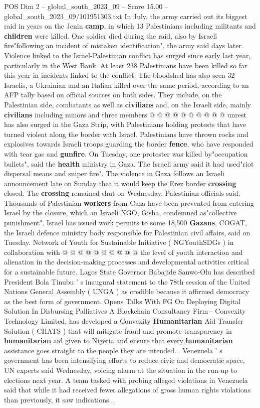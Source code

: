 \begin{textsample}{POS Dim 2 – global\_south\_2023\_09 – Score 15.00 – global\_south\_2023\_09/101951303.txt}
In July, the army carried out its biggest raid in years on the Jenin \textbf{camp}, in which 13 Palestinians including militants and \textbf{children} were killed.
One soldier died during the raid, also by Israeli fire"following an incident of mistaken identification", the army said days later.
Violence linked to the Israel-Palestinian conflict has surged since early last year, particularly in the West Bank.
At least 238 Palestinians have been killed so far this year in incidents linked to the conflict.
The bloodshed has also seen 32 Israelis, a Ukrainian and an Italian killed over the same period, according to an AFP tally based on official sources on both sides.
They include, on the Palestinian side, combatants as well as \textbf{civilians} and, on the Israeli side, mainly \textbf{civilians} including minors and three members @ @ @ @ @ @ @ @ @ @ unrest has also surged in the Gaza Strip, with Palestinians holding protests that have turned violent along the border with Israel.
Palestinians have thrown rocks and explosives towards Israeli troops guarding the border \textbf{fence}, who have responded with tear gas and \textbf{gunfire}.
On Tuesday, one protester was killed by"occupation bullets", said the \textbf{health} ministry in Gaza.
The Israeli army said it had used"riot dispersal means and sniper fire".
The violence in Gaza follows an Israeli announcement late on Sunday that it would keep the Erez border \textbf{crossing} closed.
The \textbf{crossing} remained shut on Wednesday, Palestinian officials said.
Thousands of Palestinian \textbf{workers} from Gaza have been prevented from entering Israel by the closure, which an Israeli NGO, Gisha, condemned as"collective punishment".
Israel has issued work permits to some 18,500 \textbf{Gazans}, COGAT, the Israeli defence ministry body responsible for Palestinian civil affairs, said on Tuesday.
Network of Youth for Sustainable Initiative ( NGYouthSDGs ) in collaboration with @ @ @ @ @ @ @ @ @ @ the level of youth interaction and alienation in the decision-making processes and developmental activities critical for a sustainable future.
Lagos State Governor Babajide Sanwo-Olu has described President Bola Tinubu ' s inaugural statement to the 78th session of the United Nations General Assembly ( UNGA ) as credible because it affirmed democracy as the best form of government.
Opens Talks With FG On Deploying Digital Solution In Disbursing Palliatives A Blockchain Consultancy Firm - Convexity Technology Limited, has developed a Convexity \textbf{Humanitarian} Aid Transfer Solution ( CHATS ) that will mitigate fraud and promote transparency in \textbf{humanitarian} aid given to Nigeria and ensure that every \textbf{humanitarian} assistance goes straight to the people they are intended...
Venezuela ' s government has been intensifying efforts to reduce civic and democratic space, UN experts said Wednesday, voicing alarm at the situation in the run-up to elections next year.
A team tasked with probing alleged violations in Venezuela said that while it had received fewer allegations of gross human rights violations than previously, it saw indications...


\end{textsample}

